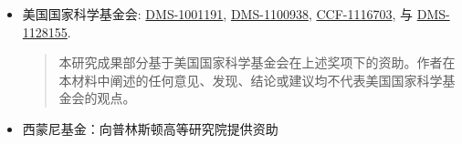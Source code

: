 {\begin{itemize}
\item 美国国家科学基金会:
  \href{http://www.nsf.gov/awardsearch/showAward.do?AwardNumber=1001191}{DMS-1001191}, %
  \href{http://www.nsf.gov/awardsearch/showAward.do?AwardNumber=1100938}{DMS-1100938}, %
  \href{http://www.nsf.gov/awardsearch/showAward.do?AwardNumber=1116703}{CCF-1116703}, %
  与
  \href{http://www.nsf.gov/awardsearch/showAward.do?AwardNumber=1128155}{DMS-1128155}. %
  {
    \setlength{\itemsep}{0pt}
    \begin{quote}
      \noindent\scriptsize
      本研究成果部分基于美国国家科学基金会在上述奖项下的资助。作者在本材料中阐述的任何意见、发现、结论或建议均不代表美国国家科学基金会的观点。
    \end{quote}
  }
\item 西蒙尼基金：向普林斯顿高等研究院提供资助          %
  \end{itemize}


}
\cleartooddpage

